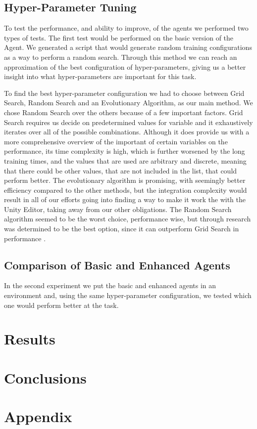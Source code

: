 \documentclass[a4paper,12pt]{article}
\begin{document}
\subsection{Hyper-Parameter Tuning}
To test the performance, and ability to improve, of the agents we performed two types of tests. The first test would be performed on the basic version of the Agent. We generated a script that would generate random training configurations as a way to perform a random search. Through this method we can reach an approximation of the best configuration of hyper-parameters, giving us a better insight into what hyper-parameters are important for this task. 

To find the best hyper-parameter configuration we had to choose between Grid Search, Random Search and an Evolutionary Algorithm, as our main method. We chose Random Search over the others because of a few important factors. Grid Search requires us decide on predetermined values for variable and it exhaustively iterates over all of the possible combinations. Although it does provide us with a more comprehensive overview of the important of certain variables on the performance, its time complexity is high, which is further worsened by the long training times, and the values that are used are arbitrary and discrete, meaning that there could be other values, that are not included in the list, that could perform better. The evolutionary algorithm is promising, with seemingly better efficiency compared to the other methods, but the integration complexity would result in all of our efforts going into finding a way to make it work the with the Unity Editor, taking away from our other obligations. The Random Search algorithm seemed to be the worst choice, performance wise, but through research was determined to be the best option, since it can outperform Grid Search in performance \cite{JMLR:v13:bergstra12a}.


\subsection{Comparison of Basic and Enhanced Agents}
In the second experiment we put the basic and enhanced agents in an environment and, using the same hyper-parameter configuration, we tested which one would perform better at the task.

\section{Results}

\section{Conclusions}
\section{Appendix}



\end{document}
